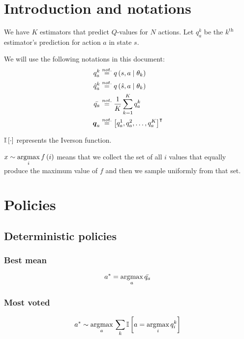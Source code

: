 \documentclass[10pt]{article}
\begin{document}
\section{Introduction and notations}
\label{sec:intro}

We have $K$ estimators that predict $Q$-values for $N$ actions. Let $q_a^k$ be
the $k^{\text{th}}$ estimator's prediction for action $a$ in state $s$.

We will use the following notations in this document:
\begin{align}
	q_a^k        & \overset{not.}{=} \func[q]{s, a \mid \theta_k}       \\
	\hat{q}_a^k  & \overset{not.}{=} \func[q]{\hat{s}, a \mid \theta_k} \\
	\bar{q_a}    & \overset{not.}{=} \frac{1}{K}\sum_{k=1}^{K} q_a^k  \\
	\tensor{q}_a & \overset{not.}{=} \trans{\left[ q_a^1, q_a^2, \ldots, q_a^K \right]}
\end{align}

$\iverson{\cdot}$ represents the Iverson function.

$x\sim \argmax{i}\func{i}$ means that we collect the set of all $i$ values that
equally produce the maximum value of $f$ and then we sample uniformly from that
set.

\section{Policies}
\label{sec:policies}

\subsection{Deterministic policies}

\subsubsection{Best mean}
\begin{equation}
	a^* = \argmax{a} \bar{q_a}
\end{equation}

\subsubsection{Most voted}
\begin{equation}
	a^* \sim \argmax{a} \sum_{k} \iverson{a = \argmax{i} q^k_i}
\end{equation}
\end{document}
